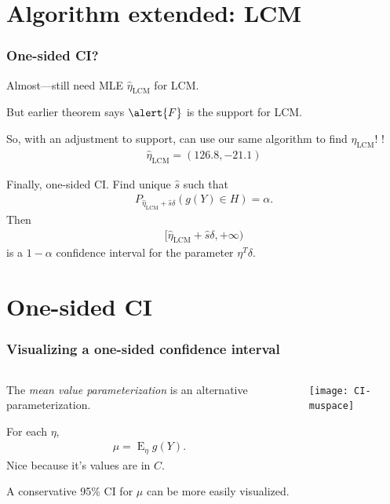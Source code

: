 \documentclass[ 10pt]{beamer}
\DeclareMathOperator{\E}{E}
\newcommand{\etaLCM}{\hat{\eta}_{\textrm{LCM}}}
\begin{document}
\section{Algorithm extended: LCM}
\frame
{
\frametitle{One-sided CI?}  
Almost---still need MLE $\etaLCM$ for LCM.
\vspace{1mm}
\pause

But earlier theorem says $\alert{F}$ is the support for LCM.
\vspace{1mm}

So, with an adjustment to support, can use our same algorithm to find $\etaLCM$!   \alert{\checkmark}!
\pause
\begin{align*}
	\etaLCM = (126.8, -21.1)
\end{align*}

Finally, one-sided CI.
\pause
Find unique $\hat{s}$ such that
\begin{align*}
		P_{\etaLCM + \hat{s} \delta}\left ( g(Y) \in H\right ) = \alpha.
\end{align*}
Then 
\begin{align*}
[ \etaLCM + \hat{s} \delta, + \infty)
\end{align*}
is a $1- \alpha$ confidence interval for the parameter $\eta^T\delta$.

}
\section{One-sided CI}
\frame
{
\frametitle{Visualizing a one-sided confidence interval}  
\begin{columns}[]
\begin{column}[T]{0.6\textwidth}
The \emph{mean value parameterization} is an alternative parameterization.  

For each $\eta$,
\begin{align*}
	\mu = \E_\eta g(Y).
\end{align*}
Nice because it's values are in $C$.
\vspace{2mm}

A conservative 95\% CI for $\mu$ 
can be more easily visualized.
\end{column}

\begin{column}[T]{0.4\textwidth}
\pause
\texttt{[image: CI-muspace]} %
\end{column}
\end{columns}
}
\end{document}
